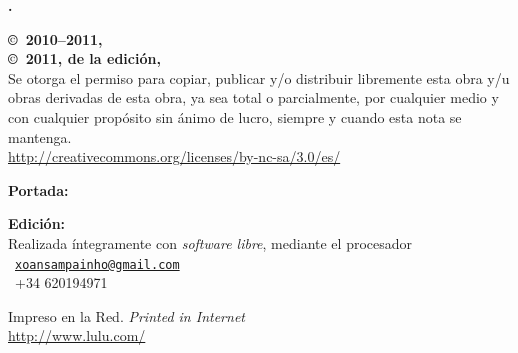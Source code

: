 \noindent
\textbf{\titlename. \subtitlename}\\
\authorname

\footnotesize

\bigskip\bigskip\noindent
\textbf{\copyright\ 2010--2011, \authorname}\\
\textbf{\copyright\ 2011, de la edición, \editorname}\\
Se otorga el permiso para copiar, publicar y/o distribuir libremente esta obra y/u obras derivadas de esta obra, ya sea total o parcialmente, por cualquier medio y con cualquier propósito sin ánimo de lucro, siempre y cuando esta nota se mantenga.\\
{\selectfont\url{http://creativecommons.org/licenses/by-nc-sa/3.0/es/}}

\normalsize

\noindent\ccbyncsaeu

\footnotesize

\bigskip\noindent
\textbf{Portada:} \coverauthorname

\bigskip\noindent
\textbf{Edición:} \editorname\\
Realizada íntegramente con \emph{software libre}, mediante el procesador \LaTeXe\\
\Letter\ {\selectfont\href{mailto:xoansampainho@gmail.com}{\nolinkurl{xoansampainho@gmail.com}}}\\
\Telefon\ +34 620194971

\bigskip\noindent
Impreso en la Red. \emph{Printed in Internet}\\
{\selectfont\url{http://www.lulu.com/}}

\normalsize

\endinput
